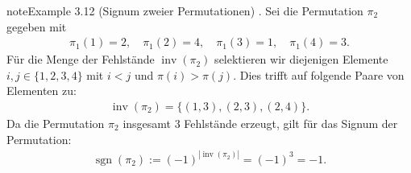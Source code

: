\documentclass[letterpaper,10pt,german]{jupyterBook}
\begin{document}
\begin{sphinxadmonition}{note}{Example 3.12 (Signum zweier Permutationen)}
. Sei die Permutation \(\pi_2\) gegeben mit
\begin{equation*}
\begin{split}\pi_1(1) = 2, \quad \pi_1(2) = 4, \quad \pi_1(3) = 1, \quad \pi_1(4) = 3.\end{split}
\end{equation*}
\sphinxAtStartPar
Für die Menge der Fehlstände \(\operatorname{inv}(\pi_2)\) selektieren wir diejenigen Elemente \(i,j \in \lbrace 1,2,3,4 \rbrace\) mit \(i < j\) und \(\pi(i) > \pi(j)\).
Dies trifft auf folgende Paare von Elementen zu:
\begin{equation*}
\begin{split}\operatorname{inv}(\pi_2) = \lbrace (1,3), (2,3), (2,4)\rbrace.\end{split}
\end{equation*}
\sphinxAtStartPar
Da die Permutation \(\pi_2\) insgesamt \(3\) Fehlstände erzeugt, gilt für das Signum der Permutation:
\begin{equation*}
\begin{split}\operatorname{sgn}(\pi_2) := (-1)^{|\operatorname{inv}(\pi_2)|} = (-1)^3 = -1.\end{split}
\end{equation*}\end{sphinxadmonition}
\end{document}
